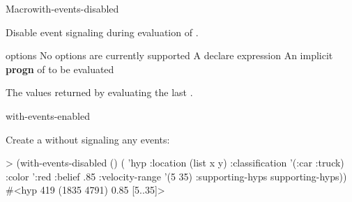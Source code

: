 \documentclass[10pt,twoside,english,pdftex]{article}
\begin{document}

\begin{functiondoc}{Macro}{with-events-disabled}%
  {\code{(}\superstar{}\code{)}
    \superstar{}
    \superstar{}
    \returns{} \superstar}
%
%
  
\fnsyntax

\fnpurpose Disable event signaling during evaluation of .

\fnpackage {}

\fnmodule {}

\fnargs
\begin{args}{options}
\arg[option] No options are currently supported
\arg[declaration] A declare expression
\arg[forms] An implicit \textbf{progn} of  to be evaluated
\end{args}

\fnreturns The values returned by evaluating the last .

\begin{alsos}{with-events-enabled}
\end{alsos}

\fnexample
{}%
Create a  without signaling any events:
%
\W\supp
\begin{example}
> (with-events-disabled ()
     ( 'hyp 
        :location (list x y)
        :classification '(:car :truck)
        :color ':red
        :belief .85
        :velocity-range '(5 35)
        :supporting-hyps supporting-hyps))
#<hyp 419 (1835 4791) 0.85 [5..35]>
\end{example}

\end{functiondoc}

\end{document}
